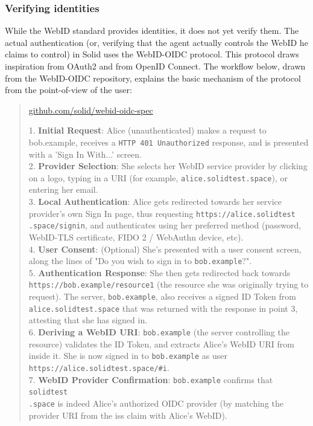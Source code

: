 \subsubsection{Verifying identities}
While the WebID standard provides identities, it does not yet verify them. The actual authentication (or, verifying that the agent actually controls the WebID he claims to control) in Solid uses the WebID-OIDC protocol. This protocol draws inspiration from OAuth2 and from OpenID Connect. The workflow below, drawn from the WebID-OIDC repository, explains the basic mechanism of the protocol from the point-of-view of the user:

\begin{quote}{\href{https://github.com/solid/webid-oidc-spec}{github.com/solid/webid-oidc-spec}}

    1. \textbf{Initial Request}: Alice (unauthenticated) makes a request to bob.example, receives a \texttt{HTTP 401 Unauthorized} response, and is presented with a 'Sign In With...' screen.\\
    
    2. \textbf{Provider Selection}: She selects her WebID service provider by clicking on a logo, typing in a URI (for example, \texttt{alice.solidtest.space}), or entering her email.\\
    
    3. \textbf{Local Authentication}: Alice gets redirected towards her service provider's own Sign In page, thus requesting \texttt{https://alice.solidtest\\.space/signin}, and authenticates using her preferred method (password, WebID-TLS certificate, FIDO 2 / WebAuthn device, etc).\\
    
    4. \textbf{User Consent}: (Optional) She's presented with a user consent screen, along the lines of "Do you wish to sign in to \texttt{bob.example}?".\\
    
    5. \textbf{Authentication Response}: She then gets redirected back towards \texttt{https://bob.example/resource1} (the resource she was originally trying to request). The server, \texttt{bob.example}, also receives a signed ID Token from \texttt{alice.solidtest.space} that was returned with the response in point 3, attesting that she has signed in.\\
    
    6. \textbf{Deriving a WebID URI}: \texttt{bob.example} (the server controlling the resource) validates the ID Token, and extracts Alice's WebID URI from inside it. She is now signed in to \texttt{bob.example} as user\\ \texttt{https://alice.solidtest.space/\#i}.\\
    
    7. \textbf{WebID Provider Confirmation}: \texttt{bob.example} confirms that \texttt{solidtest\\.space} is indeed Alice's authorized OIDC provider (by matching the provider URI from the iss claim with Alice's WebID).
\end{quote}

